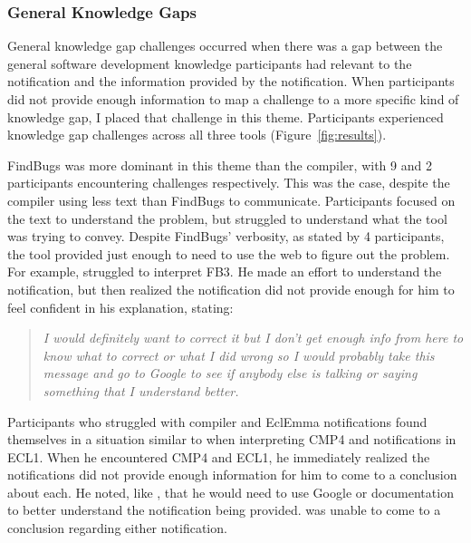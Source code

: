 \subsubsection{General Knowledge Gaps}\label{subsec:infogap}
General knowledge gap challenges occurred when there was a gap between the general 
software development knowledge participants had relevant to the notification and the 
information provided by the notification.  
When participants did not provide enough information to map a challenge to a 
more specific kind of knowledge gap, I placed that challenge in this theme.
Participants experienced knowledge gap challenges across all three tools (Figure~\ref{fig:results}). 

FindBugs was more dominant in this theme than the compiler, with 9 and 2 participants encountering challenges respectively. This was the case, despite the compiler using less text than FindBugs to communicate. Participants focused on the text to understand the problem, but struggled to understand what the tool was trying to convey. Despite FindBugs' verbosity, as stated by 4 participants, the tool provided just enough to need to use the web to figure out the problem. For example,  struggled to interpret FB3. He made an effort to understand the notification, but then realized the notification did not provide enough for him to feel confident in his explanation, stating:

\vspace{0.5em}
\begin{quote}
	\textit{I would definitely want to correct it but I don't get enough info from here to know what to correct or what I did wrong so I would probably take this message and go to Google to see if anybody else is talking or saying something that I understand better.}
\end{quote}

\noindent
Participants who struggled with compiler and EclEmma notifications found themselves in a situation similar to  when interpreting CMP4 and notifications in ECL1. When he encountered CMP4 and ECL1, he immediately realized the notifications did not provide enough information for him to come to a conclusion about each. He noted, like , that he would need to use Google or documentation to better understand the notification being provided.  was unable to come to a conclusion regarding either notification.

